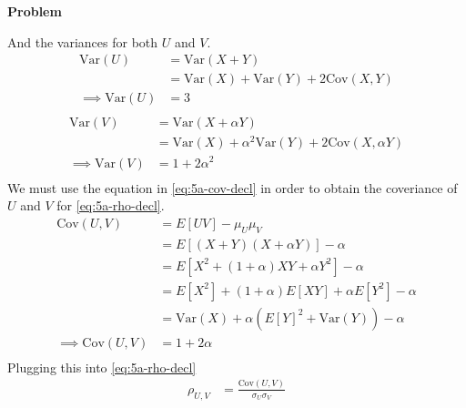 \documentclass[12pt]{article}
\newenvironment{Ex}{\textbf{Problem}\vspace{.75em}\\}{}
\begin{document}
\begin{enumerate}
\begin{Ex}
\begin{solution}
\begin{enumerate}
        And the variances for both $U$ and $V$.
        \begin{equation}
          \label{eq:5a-var-u}
          \begin{aligned}
            \text{Var}(U) &= \text{Var}(X+Y) \\
            &= \text{Var}(X) + \text{Var}(Y) + 2 \text{Cov}(X,Y) \\
            \implies \text{Var}(U) &= 3 \\
          \end{aligned}
        \end{equation}
        \begin{equation}
          \label{eq:5a-var-v}
          \begin{aligned}
            \text{Var}(V) &= \text{Var}(X + \alpha Y) \\
            &= \text{Var}(X) + \alpha^2 \text{Var}(Y) + 2
            \text{Cov}(X,\alpha Y) \\
            \implies \text{Var}(V) &= 1+2\alpha^2 \\
          \end{aligned}
        \end{equation}
        We must use the equation in \cref{eq:5a-cov-decl} in order to
        obtain the coveriance of $U$ and $V$ for \cref{eq:5a-rho-decl}.
        \begin{equation}
          \label{eq:5a-cov-aligned}
          \begin{aligned}
            \text{Cov}(U,V) &= E[UV] - \mu_U \mu_V \\
            &= E[(X+Y)(X+\alpha Y)] - \alpha \\
            &= E[X^2 + (1+\alpha)XY + \alpha Y^2] - \alpha \\
            &= E[X^2] + (1+\alpha)E[XY] + \alpha E[Y^2] - \alpha \\
            &= \text{Var}(X) + \alpha(E[Y]^2 + \text{Var}(Y)) -
            \alpha \\
            \implies \text{Cov}(U,V) &= 1 + 2\alpha \\
          \end{aligned}
        \end{equation}
        Plugging this into \cref{eq:5a-rho-decl}
        \begin{equation}
          \label{eq:5a-rho}
          \begin{aligned}
            \rho_{U,V} &= \frac{\text{Cov}(U,V)}{\sigma_U \sigma_V}
            \\

\end{aligned}
\end{equation}
\end{enumerate}
\end{solution}
\end{Ex}
\end{enumerate}
\end{document}
